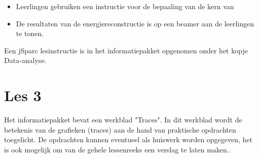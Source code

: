 \begin{itemize}
\item Leerlingen gebruiken een instructie voor de bepaaling van de kern van
\item De resultaten van de energiereconstructie is op een beamer aan de leerlingen te tonen.
\end{itemize}

Een jSparc lesinstructie is in het informatiepakket opgenomen onder het kopje Data-analyse.


\section{Les 3}
Het informatiepakket bevat een werkblad "Traces". In dit werkblad wordt de betekenis van de grafieken (traces) aan de hand van praktische opdrachten toegelicht. De opdrachten kunnen eventueel als huiswerk worden opgegeven, het is ook mogelijk om van de gehele lessenreeks een verslag te laten maken..


